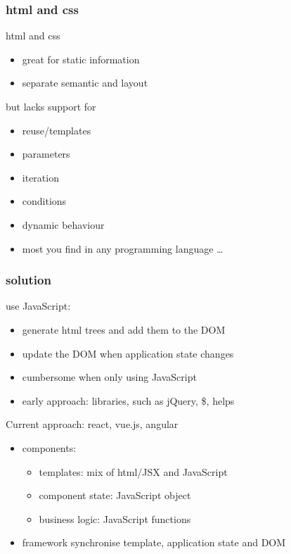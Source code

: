 \begin{frame}[fragile] \frametitle{html and css}
html and css
\begin{itemize}
  \item great for static information
  \item separate semantic and layout
\end{itemize}
but lacks support for
\begin{itemize}
  \item reuse/templates
  \item parameters
  \item iteration
  \item conditions
  \item dynamic behaviour
  \item most you find in any programming language \ldots
\end{itemize}
\end{frame}

\begin{frame}[fragile] \frametitle{solution}
use JavaScript:
\begin{itemize}
  \item generate html trees and add them to the DOM
  \item update the DOM when application state changes
  \item cumbersome when only using JavaScript
  \item early approach: libraries, such as jQuery, \$, helps
\end{itemize}
\vspace{4mm}
Current approach: react, vue.js, angular
\begin{itemize}
  \item components:
  \begin{itemize}
    \item templates: mix of html/JSX and JavaScript
    \item component state: JavaScript object
    \item business logic: JavaScript functions
  \end{itemize}
  \item framework synchronise template, application state and DOM
\end{itemize}
\end{frame}



